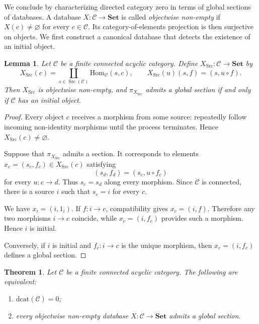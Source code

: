 \documentclass[12pt]{amsart}
\newtheorem{theorem}[teo]{Theorem}
\newtheorem{lemma}[teo]{Lemma}
\theoremstyle{definition}
\theoremstyle{remark}
\numberwithin{figure}{section}%
\newcommand{\CC}{\mathcal{C}}
\newcommand{\Sets}{\mathbf{Set}}
\newcommand{\Hom}{\mathrm{Hom}}
\begin{document}
We conclude by characterizing directed category zero in terms of global
sections of databases. A database \(X\colon\CC\to\Sets\) is called
\emph{objectwise non-empty} if \(X(c)\neq\varnothing\) for every
\(c\in\CC\). Its category-of-elements projection is then surjective on
objects. We first construct a canonical database that detects the existence of an initial object.


\begin{lemma}\label{lem:source_database}
Let \(\CC\) be a finite connected acyclic category. Define
\(X_{\operatorname{Src}}\colon\CC\to\Sets\) by
\[
X_{\operatorname{Src}}(c)
=
\coprod_{s\in\operatorname{Src}(\CC)}
\Hom_\CC(s,c),
\qquad
X_{\operatorname{Src}}(u)(s,f)
=
(s,u\circ f).
\]
Then \(X_{\operatorname{Src}}\) is objectwise non-empty, and
\(\pi_{X_{\operatorname{Src}}}\) admits a global section if and only if
\(\CC\) has an initial object.
\end{lemma}

\begin{proof}
Every object \(c\) receives a morphism from some source: repeatedly follow
incoming non-identity morphisms until the process terminates. Hence
\(X_{\operatorname{Src}}(c)\neq\varnothing\).

Suppose that \(\pi_{X_{\operatorname{Src}}}\) admits a section. It
corresponds to elements
\(x_c=(s_c,f_c)\in X_{\operatorname{Src}}(c)\) satisfying
\[
(s_d,f_d)
=
(s_c,u\circ f_c)
\]
for every \(u\colon c\to d\). Thus \(s_c=s_d\) along every morphism.
Since \(\CC\) is connected, there is a source \(i\) such that \(s_c=i\)
for every \(c\).

We have \(x_i=(i,1_i)\). If \(f\colon i\to c\), compatibility gives
\(x_c=(i,f)\). Therefore any two morphisms \(i\to c\) coincide, while
\(x_c=(i,f_c)\) provides such a morphism. Hence \(i\) is initial.

Conversely, if \(i\) is initial and \(f_c\colon i\to c\) is the unique
morphism, then \(x_c=(i,f_c)\) defines a global section.
\end{proof}

\begin{theorem}\label{prop:dcat_zero_databases}
Let \(\CC\) be a finite connected acyclic category. The following are
equivalent:
\begin{enumerate}
    \item \(\mathrm{dcat}(\CC)=0\);
    \item every objectwise non-empty database
    \(X\colon\CC\to\Sets\) admits a global section.
\end{enumerate}
\end{theorem}
\end{document}
